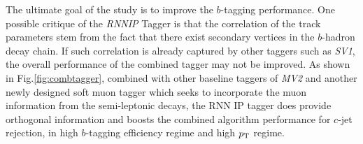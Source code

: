 \label{sec:rnn-result-combination}
The ultimate goal of the study is to improve the $b$-tagging performance. One possible critique of the \textit{RNNIP} Tagger is that the correlation of the track parameters stem from the fact that there exist secondary vertices in the $b$-hadron decay chain. If such correlation is already captured by other taggers such as \textit{SV1}, the overall performance of the combined tagger may not be improved. As shown in Fig.\ref{fig:combtagger}, combined with other baseline taggers of \textit{MV2} and another newly designed soft muon tagger which seeks to incorporate the muon information from the semi-leptonic decays, the RNN IP tagger does provide orthogonal information and boosts the combined algorithm performance for $c$-jet rejection, in high $b$-tagging efficiency regime and high $p_{{\rm T}}$ regime. 


